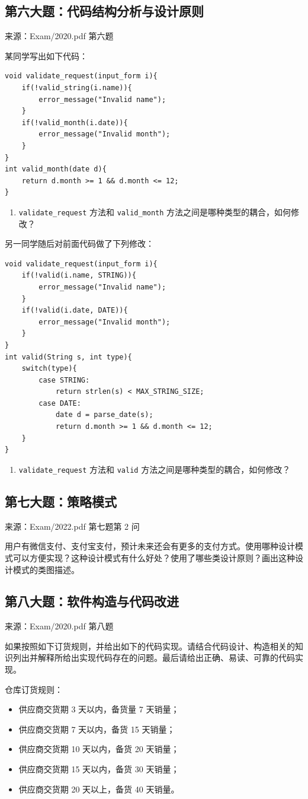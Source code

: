 \documentclass[UTF8,zihao=-4]{ctexart}
\newcommand{\qtitle}[2]{%
  \subsection*{#1}
  {\small\color{TextGray}来源：#2}\par
}
\begin{document}
\qtitle{第六大题：代码结构分析与设计原则}{Exam/2020.pdf 第六题}
某同学写出如下代码：
\begin{verbatim}
void validate_request(input_form i){
    if(!valid_string(i.name)){
        error_message("Invalid name");
    }
    if(!valid_month(i.date)){
        error_message("Invalid month");
    }
}
int valid_month(date d){
    return d.month >= 1 && d.month <= 12;
}
\end{verbatim}

\begin{enumerate}
  \item \verb|validate_request| 方法和 \verb|valid_month| 方法之间是哪种类型的耦合，如何修改？
\end{enumerate}

另一同学随后对前面代码做了下列修改：
\begin{verbatim}
void validate_request(input_form i){
    if(!valid(i.name, STRING)){
        error_message("Invalid name");
    }
    if(!valid(i.date, DATE)){
        error_message("Invalid month");
    }
}
int valid(String s, int type){
    switch(type){
        case STRING:
            return strlen(s) < MAX_STRING_SIZE;
        case DATE:
            date d = parse_date(s);
            return d.month >= 1 && d.month <= 12;
    }
}
\end{verbatim}

\begin{enumerate}[resume]
  \item \verb|validate_request| 方法和 \verb|valid| 方法之间是哪种类型的耦合，如何修改？
\end{enumerate}

\qtitle{第七大题：策略模式}{Exam/2022.pdf 第七题第 2 问}
用户有微信支付、支付宝支付，预计未来还会有更多的支付方式。使用哪种设计模式可以方便实现？这种设计模式有什么好处？使用了哪些类设计原则？画出这种设计模式的类图描述。

\qtitle{第八大题：软件构造与代码改进}{Exam/2020.pdf 第八题}
如果按照如下订货规则，并给出如下的代码实现。请结合代码设计、构造相关的知识列出并解释所给出实现代码存在的问题。最后请给出正确、易读、可靠的代码实现。

仓库订货规则：
\begin{itemize}
  \item 供应商交货期 3 天以内，备货量 7 天销量；
  \item 供应商交货期 7 天以内，备货 15 天销量；
  \item 供应商交货期 10 天以内，备货 20 天销量；
  \item 供应商交货期 15 天以内，备货 30 天销量；
  \item 供应商交货期 20 天以上，备货 40 天销量。
\end{itemize}
\end{document}
